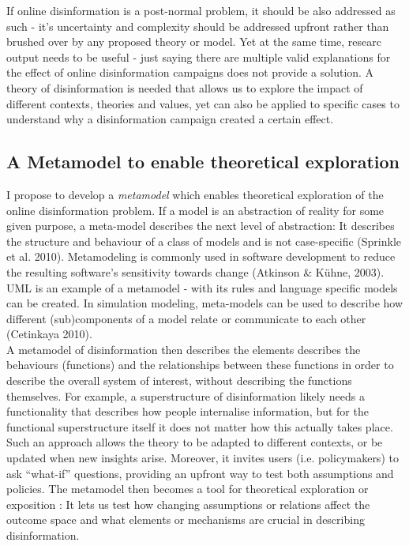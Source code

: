  If online disinformation is a post-normal problem, it should be also addressed as such - it's uncertainty and complexity should be addressed upfront rather than brushed over by any proposed theory or model. Yet at the same time, researc output needs to be useful - just saying there are multiple valid explanations for the effect of online disinformation campaigns does not provide a solution. A theory of disinformation is needed that allows us to explore the impact of different contexts, theories and values, yet can also be applied to specific cases to understand why a disinformation campaign created a certain effect.

\subsection{A Metamodel to enable theoretical exploration}
I propose to develop a \textit{metamodel} which enables theoretical exploration of the online disinformation problem. If a model is an abstraction of reality for some given purpose, a meta-model describes the next level of abstraction: It describes the structure and behaviour of a class of models and is not case-specific (Sprinkle et al. 2010). Metamodeling is commonly used in software development to reduce the resulting software's sensitivity towards change (Atkinson \& Kühne, 2003). UML is an example of a metamodel - with its rules and language specific models can be created. In simulation modeling, meta-models can be used to describe how different (sub)components of a model relate or communicate to each other (Cetinkaya 2010). \\

A metamodel of disinformation then describes the elements describes the behaviours (functions) and the relationships between these functions in order to describe the overall system of interest, without describing the functions themselves. For example, a superstructure of disinformation likely needs a functionality that describes how people internalise information, but for the functional superstructure itself it does not matter how this actually takes place. Such an approach allows the theory to be adapted to different contexts, or be updated when new insights arise. Moreover, it invites users (i.e. policymakers) to ask “what-if” questions, providing an upfront way to test both assumptions and policies. The metamodel then becomes a tool for theoretical exploration or exposition \cite{Edmonds2017}: It lets us test how changing assumptions or relations affect the outcome space and what elements or mechanisms are crucial in describing disinformation.

